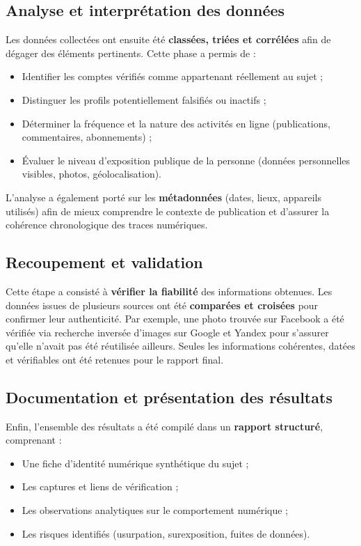 \documentclass[memoire, 12pt]{report}
\begin{document}
\subsection{Analyse et interprétation des données}
Les données collectées ont ensuite été \textbf{classées, triées et corrélées} afin de dégager des éléments pertinents.  
Cette phase a permis de :
\begin{itemize}
    \item Identifier les comptes vérifiés comme appartenant réellement au sujet ;
    \item Distinguer les profils potentiellement falsifiés ou inactifs ;
    \item Déterminer la fréquence et la nature des activités en ligne (publications, commentaires, abonnements) ;
    \item Évaluer le niveau d’exposition publique de la personne (données personnelles visibles, photos, géolocalisation).
\end{itemize}

L’analyse a également porté sur les \textbf{métadonnées} (dates, lieux, appareils utilisés) afin de mieux comprendre le contexte de publication et d’assurer la cohérence chronologique des traces numériques.

\subsection{Recoupement et validation}
Cette étape a consisté à \textbf{vérifier la fiabilité} des informations obtenues.  
Les données issues de plusieurs sources ont été \textbf{comparées et croisées} pour confirmer leur authenticité.  
Par exemple, une photo trouvée sur Facebook a été vérifiée via recherche inversée d’images sur Google et Yandex pour s’assurer qu’elle n’avait pas été réutilisée ailleurs.  
Seules les informations cohérentes, datées et vérifiables ont été retenues pour le rapport final.  

\subsection{Documentation et présentation des résultats}
Enfin, l’ensemble des résultats a été compilé dans un \textbf{rapport structuré}, comprenant :
\begin{itemize}
    \item Une fiche d’identité numérique synthétique du sujet ;
    \item Les captures et liens de vérification ;
    \item Les observations analytiques sur le comportement numérique ;
    \item Les risques identifiés (usurpation, surexposition, fuites de données).
\end{itemize}
\end{document}
